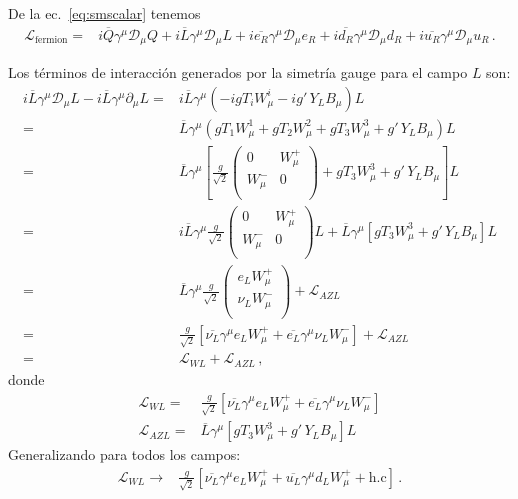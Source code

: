 \begin{frame}
De la ec.~\eqref{eq:smscalar} tenemos
\begin{align}
  \label{eq:lfermion}
  \mathcal{L}_{\text{fermion}}=&i\overline{Q}\gamma^\mu\mathcal{D}_\mu Q+i\overline{L}\gamma^\mu\mathcal{D}_\mu L+
i\overline{e_R}\gamma^\mu\mathcal{D}_\mu {e_R}+i\overline{d_R}\gamma^\mu\mathcal{D}_\mu {d_R}+i\overline{u_R}\gamma^\mu\mathcal{D}_\mu {u_R}\,.
\end{align}

Los términos de interacción generados por la simetría gauge para el campo $L$ son:
\begin{align}
  i\overline{L}\gamma^\mu\mathcal{D}_\mu L-i\overline{L}\gamma^\mu\partial_\mu L
=&i\overline{L}\gamma^\mu(-i g T_iW_\mu^i-i g'\,Y_LB_\mu) L\nonumber\\
=&\overline{L}\gamma^\mu(g T_1W_\mu^1+ g T_2W_\mu^2+g T_3W_\mu^3+g'\,Y_LB_\mu) L\nonumber\\
=&\overline{L}\gamma^\mu\left[\frac{g}{\sqrt{2}}
  \begin{pmatrix}
0 & W_\mu^+\\
W_\mu^- & 0\\    
  \end{pmatrix}
+g T_3W_\mu^3+g'\,Y_LB_\mu
\right]L\nonumber\\
=&i\overline{L}\gamma^\mu\frac{g}{\sqrt{2}}
  \begin{pmatrix}
0 & W_\mu^+\\
W_\mu^- & 0\\    
  \end{pmatrix}L+
\overline{L}\gamma^\mu\left[g T_3W_\mu^3+g'\,Y_LB_\mu
\right]L\nonumber\\
  =&\overline{L}\gamma^\mu\frac{g}{\sqrt{2}}
  \begin{pmatrix}
e_LW_\mu^+\\
\nu_L W_\mu^-\\    
  \end{pmatrix}+\mathcal{L}_{A Z L}\nonumber\\
  =&
\frac{g}{\sqrt{2}}\left[\overline{\nu_L}\gamma^\mu e_LW_\mu^++
\overline{e_L}\gamma^\mu\nu_L W_\mu^-\right]    
+\mathcal{L}_{A Z L}\nonumber\\
  =&
\mathcal{L}_{W L}    
+\mathcal{L}_{A Z L}\,,
\end{align}
donde
\begin{align}
  \mathcal{L}_{W L}=&\frac{g}{\sqrt{2}}\left[\overline{\nu_L}\gamma^\mu e_LW_\mu^++
\overline{e_L}\gamma^\mu\nu_L W_\mu^-\right]\nonumber\\    
  \mathcal{L}_{A Z L}=&\overline{L}\gamma^\mu\left[g T_3W_\mu^3+g'\,Y_LB_\mu\right]L
\end{align}
Generalizando para todos los campos:
\begin{align}
  \label{eq:wl}
   \mathcal{L}_{W L}\to&\frac{g}{\sqrt{2}}\left[\overline{\nu_L}\gamma^\mu e_LW_\mu^++
\overline{u_L}\gamma^\mu d_LW_\mu^++\text{h.c}\right]\,.
\end{align}



\end{frame}
